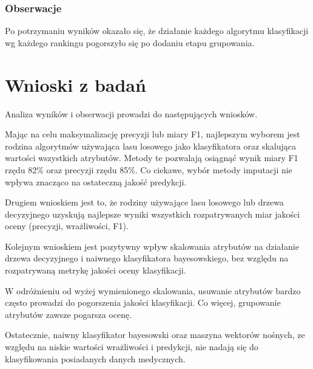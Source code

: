 \documentclass[../thesis.tex]{subfiles}
\begin{document}
\subsubsection{Obserwacje}

Po potrzymaniu wyników okazało się, że działanie każdego algorytmu klasyfikacji wg każdego rankingu pogorszyło się po dodaniu etapu grupowania.

\section{Wnioski z badań}

Analiza wyników i obserwacji prowadzi do następujących wniosków.

Mając na celu maksymalizację precyzji lub miary F1, najlepszym wyborem jest rodzina algorytmów używająca lasu losowego jako klasyfikatora oraz skalująca wartości wszystkich atrybutów. Metody te pozwalają osiągnąć wynik miary F1 rzędu 82\% oraz precyzji rzędu 85\%. Co ciekawe, wybór metody imputacji nie wpływa znacząco na ostateczną jakość predykcji.

Drugiem wnioskiem jest to, że rodziny używające lasu losowego lub drzewa decyzyjnego uzyskują najlepsze wyniki wszystkich rozpatrywanych miar jakości oceny (precyzji, wrażliwości, F1).

Kolejnym wnioskiem jest pozytywny wpływ skalowania atrybutów na działanie drzewa decyzyjnego i naiwnego klasyfikatora bayesowskiego, bez względu na rozpatrywaną metrykę jakości oceny klasyfikacji.

W odróżnieniu od wyżej wymienionego skalowania, usuwanie atrybutów bardzo często prowadzi do pogorszenia jakości klasyfikacji. Co więcej, grupowanie atrybutów zawsze pogarsza ocenę.

Ostatecznie, naiwny klasyfikator bayesowski oraz maszyna wektorów nośnych, ze względu na niskie wartości wrażliwości i predykcji, nie nadają się do klasyfikowania posiadanych danych medycznych.
\end{document}
